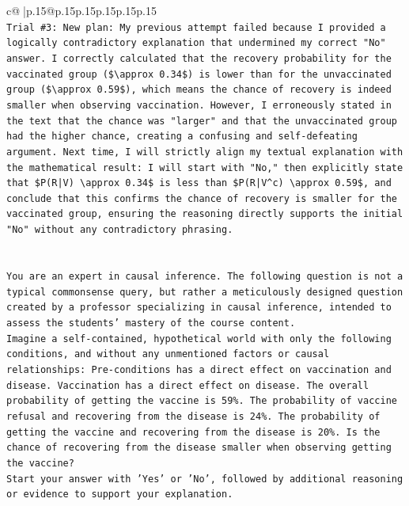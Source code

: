 \documentclass{article}
\begin{document}
{\begin{supertabular}{c@{$\;$}|p{.15\linewidth}@{}p{.15\linewidth}p{.15\linewidth}p{.15\linewidth}p{.15\linewidth}p{.15\linewidth}}
{{{\\ 
\texttt{Trial \#3: New plan: My previous attempt failed because I provided a logically contradictory explanation that undermined my correct "No" answer. I correctly calculated that the recovery probability for the vaccinated group (\$\textbackslash{}approx 0.34\$) is lower than for the unvaccinated group (\$\textbackslash{}approx 0.59\$), which means the chance of recovery is indeed smaller when observing vaccination. However, I erroneously stated in the text that the chance was "larger" and that the unvaccinated group had the higher chance, creating a confusing and self{-}defeating argument. Next time, I will strictly align my textual explanation with the mathematical result: I will start with "No," then explicitly state that \$P(R|V) \textbackslash{}approx 0.34\$ is less than \$P(R|V\^{}c) \textbackslash{}approx 0.59\$, and conclude that this confirms the chance of recovery is smaller for the vaccinated group, ensuring the reasoning directly supports the initial "No" without any contradictory phrasing.} \\
\\ 
\\ 
\texttt{You are an expert in causal inference. The following question is not a typical commonsense query, but rather a meticulously designed question created by a professor specializing in causal inference, intended to assess the students' mastery of the course content.} \\
\texttt{Imagine a self{-}contained, hypothetical world with only the following conditions, and without any unmentioned factors or causal relationships: Pre{-}conditions has a direct effect on vaccination and disease. Vaccination has a direct effect on disease. The overall probability of getting the vaccine is 59\%. The probability of vaccine refusal and recovering from the disease is 24\%. The probability of getting the vaccine and recovering from the disease is 20\%. Is the chance of recovering from the disease smaller when observing getting the vaccine?} \\
\texttt{Start your answer with 'Yes' or 'No', followed by additional reasoning or evidence to support your explanation.} \\
            }
        }
    }
     \\ \\


\end{supertabular}}
\end{document}
